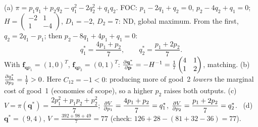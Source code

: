 \begin{solutions}
  \item (a) $\pi=p_1q_1+p_2q_2-q_1^{2}-2q_2^{2}+q_1q_2$. FOC:
        $p_1-2q_1+q_2=0$, $p_2-4q_2+q_1=0$;
        $H=\begin{pmatrix}-2&1\\1&-4\end{pmatrix}$, $D_1=-2$, $D_2=7$: ND,
        global maximum. From the first, $q_2=2q_1-p_1$; then
        $p_2-8q_1+4p_1+q_1=0$:
        \[
          q_1^*=\frac{4p_1+p_2}{7},\qquad q_2^*=\frac{p_1+2p_2}{7}.
        \]
        With $\mathbf{f}_{\mathbf{q}p_1}=(1,0)^{T}$,
        $\mathbf{f}_{\mathbf{q}p_2}=(0,1)^{T}$:
        $\frac{\partial \mathbf{q}^*}{\partial \mathbf{p}}=-H^{-1}
        =\tfrac17\begin{pmatrix}4&1\\1&2\end{pmatrix}$, matching.
        (b) $\frac{\partial q_1^*}{\partial p_2}=\tfrac17>0$. Here $C_{12}=-1<0$: producing more
        of good~2 \emph{lowers} the marginal cost of good~1 (economies of
        scope), so a higher $p_2$ raises both outputs.
        (c) $V=\pi(\mathbf{q}^*)=\dfrac{2p_1^{2}+p_1p_2+p_2^{2}}{7}$;
        $\frac{\partial V}{\partial p_1}=\dfrac{4p_1+p_2}{7}=q_1^*$,
        $\frac{\partial V}{\partial p_2}=\dfrac{p_1+2p_2}{7}=q_2^*$. \checkmark\
        (d) $\mathbf{q}^*=(9,4)$, $V=\tfrac{392+98+49}{7}=77$ (check:
        $126+28-(81+32-36)=77$).


\end{solutions}
